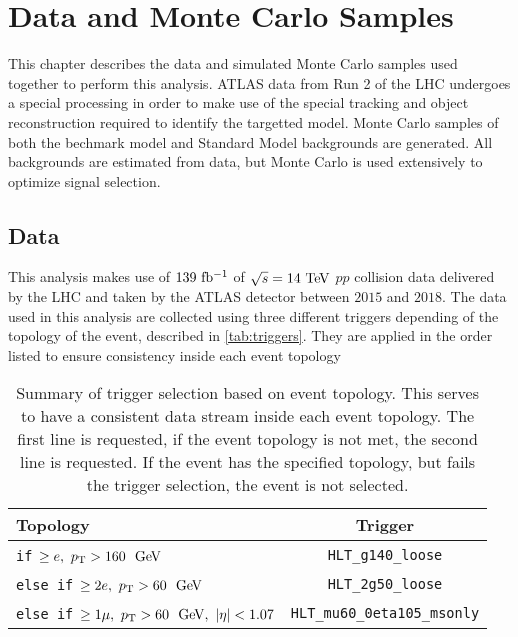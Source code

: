 \chapter{Data and Monte Carlo Samples}

This chapter describes the data and simulated Monte Carlo samples used together to perform this analysis. ATLAS data from Run 2 of the LHC undergoes a special processing in order to make use of the special tracking and object reconstruction required to identify the targetted model. Monte Carlo samples of both the bechmark model and Standard Model backgrounds are generated. All backgrounds are estimated from data, but Monte Carlo is used extensively to optimize signal selection.

\section{Data}

This analysis makes use of $139~\mbox{fb\(^{-1}\)}$ of $\sqrt{s}=14\TeV$ $pp$ collision data delivered by the \ac{LHC} and taken by the \ac{ATLAS} detector between $2015$ and $2018$. The data used in this analysis are collected using three different triggers depending of the topology of the event, described in \autoref{tab:triggers}. They are applied in the order listed to ensure consistency inside each event topology

\begin{table}[htb]
\small
\begin{center}
\begin{tabular}{l|c}
Topology       & Trigger \\
\hline
\texttt{if} $\geq e,~\pt > 160~\gev$      & \texttt{HLT\_g140\_loose}    \\
\texttt{else if} $\geq 2e,~\pt > 60~\gev$  & \texttt{HLT\_2g50\_loose} \\
\texttt{else if} $\geq 1 \mu,~\pt > 60~\gev,~|\eta| < 1.07$                            & \texttt{HLT\_mu60\_0eta105\_msonly}   \\
\end{tabular}
\caption{Summary of trigger selection based on event topology. This serves to have a consistent data stream inside each event topology. The first line is requested, if the event topology is not met, the second line is requested. If the event has the specified topology, but fails the trigger selection, the event is not selected.}
\label{tab:triggers}
\end{center}
\end{table}

